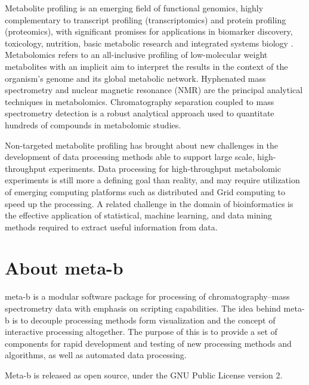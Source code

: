 Metabolite profiling is an emerging field of functional genomics,
highly complementary to transcript profiling (transcriptomics) and
protein profiling (proteomics), with significant promises for
applications in biomarker discovery, toxicology, nutrition, basic
metabolic research and integrated systems biology \cite{fiehn00,allen03}.
Metabolomics refers to an all-inclusive profiling of low-molecular
weight metabolites with an implicit aim to interpret the results
in the context of the organism's genome and its global metabolic
network. Hyphenated mass spectrometry and nuclear magnetic resonance
(NMR) are the principal analytical techniques in metabolomics.
Chromatography separation coupled to mass spectrometry detection
is a robust analytical approach used to quantitate hundreds of
compounds in metabolomic studies.

Non-targeted metabolite profiling has brought about new challenges
in the development of data processing methods able to support
large scale, high-throughput experiments. Data processing for
high-throughput metabolomic experiments is still more a defining
goal than reality, and may require utilization of emerging computing
platforms such as distributed and Grid computing to speed up the
processing. A related challenge in the domain of bioinformatics
is the effective application of statistical, machine learning,
and data mining methods required to extract useful information
from data.

\section{About meta-b}

meta-b is a modular software package for processing of
chromatography--mass spectrometry data with emphasis on scripting
capabilities. The idea behind meta-b is to decouple processing
methods form visualization and the concept of interactive
processing altogether. The purpose of this is to provide a set
of components for rapid development and testing of new processing
methods and algorithms, as well as automated data processing.

Meta-b is released as open source, under the GNU Public License
version 2.  


